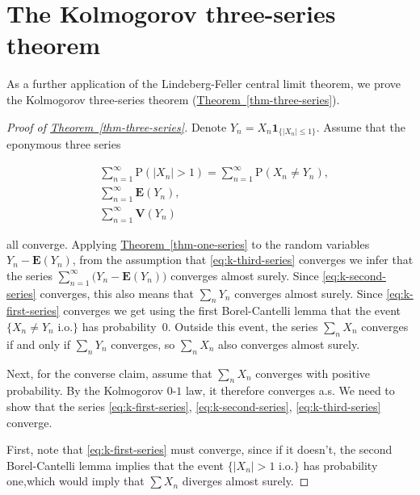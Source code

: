 \section{The Kolmogorov three-series theorem}
\label{sec-k-3-series}

As a further application of the Lindeberg-Feller
central limit theorem, we prove the Kolmogorov
three-series theorem (\hyperref[thm-three-series]{Theorem~\ref*{thm-three-series}}).

\begin{proof}[Proof of \texorpdfstring{\hyperref[thm-three-series]{Theorem~\ref*{thm-three-series}}}{Theorem}]
Denote $Y_n = X_n \mathbf{1}_{\{|X_n|\le 1\}}$.
Assume that the eponymous three series

\begin{align*}
\tag{17}\label{eq:k-first-series} &\sum_{n=1}^\infty \mathrm{P}(|X_n|>1) = \sum_{n=1}^\infty \mathrm{P}(X_n\neq Y_n), \\
\tag{18}\label{eq:k-second-series} &\sum_{n=1}^\infty \mathbf{E}(Y_n), \\
\tag{19}\label{eq:k-third-series} &\sum_{n=1}^\infty \mathbf{V}(Y_n)
\end{align*}

\noindent all converge. Applying \hyperref[thm-one-series]{Theorem~\ref*{thm-one-series}} to
the random variables $Y_n-\mathbf{E}(Y_n)$, from the
assumption that \eqref{eq:k-third-series} converges we
infer that the series
$\sum_{n=1}^\infty \big( Y_n-\mathbf{E}(Y_n) \big)$
converges almost surely. Since \eqref{eq:k-second-series}
converges, this also means that $\sum_n Y_n$
converges almost surely. Since \eqref{eq:k-first-series}
converges we get using the first Borel-Cantelli lemma
that the event $\{ X_n \neq Y_n\textrm{ i.o.} \}$ has
probability~$0$. Outside this event, the series
$\sum_n X_n$ converges if and only if $\sum_n Y_n$
converges, so $\sum_n X_n$ also converges almost
surely.

Next, for the converse claim, assume that $\sum_n X_n$
converges with positive probability. By the Kolmogorov
$0$-$1$ law, it therefore converges a.s. We need to
show that the series \eqref{eq:k-first-series},
\eqref{eq:k-second-series}, \eqref{eq:k-third-series}
converge.

First, note that \eqref{eq:k-first-series} must converge,
since if it doesn't, the second Borel-Cantelli lemma
implies that the event $\{ |X_n|>1 \textrm{ i.o.} \}$
has probability one,which would imply that $\sum X_n$
diverges almost surely.


\end{proof}

